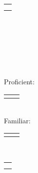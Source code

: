 {		\noindent\begin{minipage}{\linewidth}
		\majorsection{\skillslanguage}
			\begin{tabular}{l}
				\skillenglish \\
				\skilljapanese
			\end{tabular}  \halflinebreak
		\\
		\end{minipage}
		
		\noindent\begin{minipage}{\linewidth}
		\majorsection{\projects} 
		\projectParasite 
		\projectPytext 
		\end{minipage}
		

	}{ %
	
		
		\noindent\begin{minipage}[t]{0.275\textwidth}
			
			\sidesection{\educationhistory}	\\[0.25\baselineskip]
			\educationUW 
			\educationToudai
			\educationEvergreen
			\educationHyogo
			
			\sidesection{\courses} \\
			\sidebarcoursework
			
			
			\sidesection{\skills} \\ 
			Proficient:\\[0.25\baselineskip]
			\begin{tabular}{l l}
				\proficientskills
			\end{tabular}\\
			Familiar: \\[0.25\baselineskip]
			\begin{tabular}{l l} 
				\familiarskills
			\end{tabular}

			
			\sidesection{\skillslanguage} \\
			\begin{tabular}{l}
				\skillenglish \\
				\skilljapanese
			\end{tabular} \quarterlinebreak \\
			
			
		\end{minipage}
		\hfill
		\begin{minipage}[t]{0.7\textwidth}
			\majorsection{\experience} 
				\jobexpOctanoveIntern
				\jobexpNPD
				\jobexpGSP
				\jobexpGDIIntern	
		\majorsection{\graduatecoursework} 
		\courseworkML
		\courseworkNLM
		\courseworkNLP

		\majorsection{\projectsawards\vspace{-0.25\baselineskip}} 
		\awardAmplify 
		\awardGoldenTicket 
		\projectParasite
		
		\end{minipage}
		
	}
	
